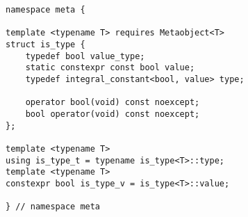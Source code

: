 
\begin{verbatim}
namespace meta {

template <typename T> requires Metaobject<T>
struct is_type {
	typedef bool value_type;
	static constexpr const bool value;
	typedef integral_constant<bool, value> type;

	operator bool(void) const noexcept;
	bool operator(void) const noexcept;
};

template <typename T>
using is_type_t = typename is_type<T>::type;
template <typename T>
constexpr bool is_type_v = is_type<T>::value;

} // namespace meta
\end{verbatim}

